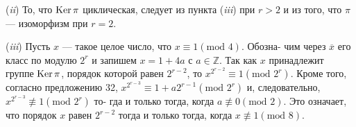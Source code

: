 \begin{myproof}
\par  (\textit{ii}) То, что $\operatorname{Ker}{\pi}$ циклическая, следует из пункта (\textit{iii}) при $r > 2$\linebreak
и из того, что $\pi$ --- изоморфизм при $r = 2$.
\par  (\textit{iii}) Пусть $x$ — такое целое число, что $x \equiv 1 (\text{mod } 4)$. Обозна­-\linebreak
чим через $\overline{x}$ его класс по модулю $2^r$ и запишем $x = 1 + 4a$ с
$a \in \mathbb{Z}$. Так как $x$ принадлежит группе $\operatorname{Ker}{\pi}$, порядок которой равен\linebreak
$2^{r-2}$, то $x^{2^{r-2}} \equiv 1 (\text{mod } 2^r)$. Кроме того, согласно предложению 32,\linebreak
$x^{2^{r-3}} \equiv 1 + a2^{r-1} (\text{mod } 2^r)$ и, следовательно, $x^{2^{r-3}} \not\equiv 1 (\text{mod } 2^r)$ то­-\linebreak
гда и только тогда, когда $a \not\equiv 0 (\text{mod } 2)$. Это означает, что порядок\linebreak
$x$ равен $2^{r-2}$ тогда и только тогда, когда $x \not\equiv 1 (\text{mod }8)$.
\end{myproof}
